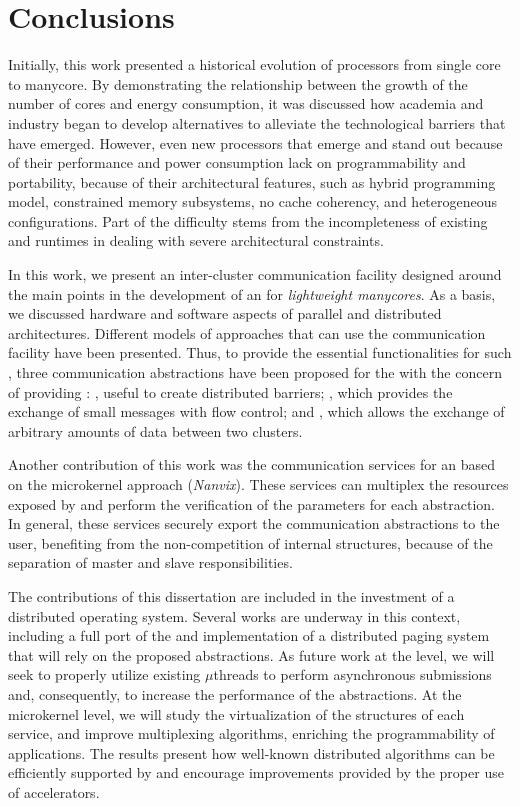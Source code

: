 \chapter{Conclusions}
\label{ch.conclusions}

	Initially, this work presented a historical evolution of processors from single core
	to manycore. By demonstrating the relationship between the growth of the
	number of cores and energy consumption, it was discussed how academia and
	industry began to develop alternatives to alleviate the technological barriers
	that have emerged. However, even new processors that emerge and stand out
	because of their performance and power consumption lack on programmability
	and portability, because of their architectural features, such as hybrid
	programming model, constrained memory subsystems, no cache coherency, and
	heterogeneous configurations. Part of the difficulty stems from the
	incompleteness of existing \oss and runtimes in dealing with severe
	architectural constraints.

	In this work, we present an inter-cluster communication facility designed
	around the main points in the development of an \os for
	\textit{lightweight manycores}. As a basis, we discussed hardware and software
	aspects of parallel and distributed architectures. Different models of
	\os approaches that can use the communication facility have been presented.
	Thus, to provide the essential functionalities for such \oss, three
	communication abstractions have been proposed for the \nanvixhal with the concern of
	providing \qos: \sync, useful to create distributed
	barriers; \mailbox, which provides the exchange of small messages
	with flow control; and \portal, which allows the exchange
	of arbitrary amounts of data between two clusters.

	Another contribution of this work was the communication services for an \os
	based on the microkernel approach (\textit{Nanvix}). These services can multiplex
	the resources exposed by \hal and perform the verification of the parameters for
	each abstraction. In general, these services securely export the communication
	abstractions to the user, benefiting from the non-competition of \os internal
	structures, because of the separation of master and slave responsibilities.

	The contributions of this dissertation are included in the investment of a
	distributed operating system. Several works are underway in this context,
	including a full port of the \mpi and implementation of a distributed paging
	system that will rely on the proposed abstractions. As future work at the \hal level, we will
	seek to properly utilize existing \dma $\mu$threads to perform asynchronous
	submissions and, consequently, to increase the performance of the abstractions. At
	the microkernel level, we will study the virtualization of the structures of
	each service, and improve multiplexing algorithms, enriching the
	programmability of applications. The results present how well-known
	distributed algorithms can be efficiently supported by \nanvixos and
	encourage improvements provided by the proper use of \dma accelerators.
